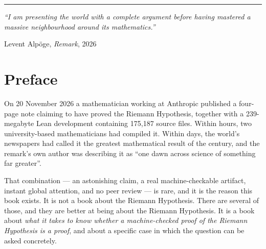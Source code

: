 \clearpage
\thispagestyle{empty}
\vspace*{2.0in}
  \begin{center}
    \begin{minipage}{0.88\textwidth}
      \raggedright
      {\sffamily\color{accent}\rule{\textwidth}{2pt}}\par
      \vspace{14pt}
      {\large\itshape\color{txt}
      ``I am presenting the world with a complete argument before having mastered
      a massive neighbourhood around its mathematics.''\par}
      \vspace{12pt}
      {\raggedleft\sffamily\small\color{txtdim}
      Levent Alpöge, \emph{Remark}, 2026\par}
    \end{minipage}
  \end{center}
  \vfill
\clearpage

\clearpage
{}
\tableofcontents

\clearpage
{}
\listoffigures

\clearpage
{}
\listoftables

\chapter*{Preface}

\thispagestyle{plain}

On 20 November 2026 a mathematician working at Anthropic published a four-page
note claiming to have proved the Riemann Hypothesis, together with a 239-megabyte
Lean development containing 175{,}187 source files. Within hours, two
university-based mathematicians had compiled it. Within days, the world's
newspapers had called it the greatest mathematical result of the century, and
the remark's own author was describing it as ``one dawn across science of
something far greater''.

That combination --- an astonishing claim, a real machine-checkable artifact,
instant global attention, and no peer review --- is rare, and it is the reason
this book exists. It is not a book about the Riemann Hypothesis. There are
several of those, and they are better at being about the Riemann Hypothesis.
It is a book about \emph{what it takes to know whether a machine-checked proof
of the Riemann Hypothesis is a proof}, and about a specific case in which the
question can be asked concretely.


